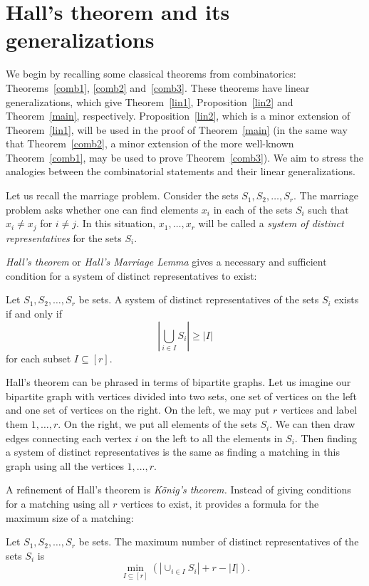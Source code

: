 \documentclass[ALCO,ThmDefs,Unicode,epreuves]{cedram}
\begin{document}
\section{Hall's theorem and its generalizations}\label{sect2}

We begin by recalling some classical theorems from combinatorics: Theorems~\ref{comb1}, \ref{comb2} and~\ref{comb3}. These theorems have linear generalizations, which give Theorem~\ref{lin1}, Proposition~\ref{lin2} and Theorem~\ref{main}, respectively. Proposition~\ref{lin2}, which is a minor extension of Theorem~\ref{lin1}, will be used in the proof of Theorem~\ref{main} (in the same way that Theorem~\ref{comb2}, a minor extension of the more well-known Theorem~\ref{comb1}, may be used to prove Theorem~\ref{comb3}). We aim to stress the analogies between the combinatorial statements and their linear generalizations.

Let us recall the marriage problem. Consider the sets $S_1, S_2, \dots, S_r$. The marriage problem asks whether one can find elements $x_i$ in each of the sets $S_i$ such that $x_i \neq x_j$ for $i \neq j$. In this situation, $x_1, \dots, x_r$ will be called a \emph{system of distinct representatives} for the sets $S_i$.

\emph{Hall's theorem} or \emph{Hall's Marriage Lemma} gives a necessary and sufficient condition for a system of distinct representatives to exist:
\begin{theorem}[Hall] \label{comb1}
Let $S_1,S_2,\ldots,S_r$ be sets. A system of distinct representatives of the sets $S_i$ exists if and only if
\[
 \left|\bigcup_{i \in I} S_i\right| \geq |I| %
\]
for each subset $I \subseteq [r]$.
\end{theorem}

Hall's theorem can be phrased in terms of bipartite graphs. Let us imagine our bipartite graph with vertices divided into two sets, one set of vertices on the left and one set of vertices on the right. On the left, we may put $r$ vertices and label them $1, \dots, r$. On the right, we put all elements of the sets $S_i$. We can then draw edges connecting each vertex $i$ on the left to all the elements in $S_i$. Then finding a system of distinct representatives is the same as finding a matching in this graph using all the vertices $1, \dots, r$.

A refinement of Hall's theorem is \emph{K{\"o}nig's theorem.} Instead of giving conditions for a matching using all $r$ vertices to exist, it provides a formula for the maximum size of a matching:
\begin{theorem}[K{\"o}nig] \label{comb2}
Let $S_1,S_2, \dots,S_r$ be sets. The maximum number of distinct representatives of the sets $S_i$ is
\[
 \min_{I \subseteq [r]} \left( \left| \cup_{i\in I} S_i \right| + r - |I| \right). 
\]
\end{theorem}
\end{document}
